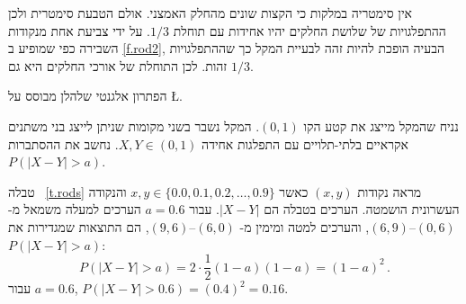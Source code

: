 אין סימטריה במלקות כי הקצות שונים מהחלק האמצני. אולם הטבעת סימטרית ולכן ההתפלגויות של שלושת החלקים יהיו אחידות עם תוחלת
$1/3$.
על ידי צביעת אחת מנקודות השבירה כפי שמופיע ב%
\ref{f.rod2},
הבעיה הופכת להיות זהה לבעיית המקל כך שההתפלגויות זהות. לכן התוחלת של אורכי החלקים היא גם
$1/3$.


הפתרון אלגנטי שלהלן מבוסס על
\L{\cite{stack-rods}}.

נניח שהמקל מייצג את קטע הקו 
$(0,1)$.
המקל נשבר בשני מקומות שניתן לייצג בני משתנים אקראיים בלתי-תלויים עם התפלגות אחידה
$X,Y\in (0,1)$.
נחשב את ההסתברות
$P(|X-Y|>a)$.

טבלה%
~\ref{t.rods}
מראה נקודות 
$(x,y)$
כאשר
$x,y \in \{0.0, 0.1, 0.2, \ldots, 0.9\}$
והנקודה העשרונית הושמטה. הערכים בטבלה הם
$|X-Y|$.
עבור
$a=0.6$
הערכים למעלה משמאל מ-%
$(0,6)$--$(6,9)$,
והערכים למטה ומימין מ-%
$(6,0)$--$(9,6)$,
הם התוצאות שמגדירות את
$P(|X-Y|>a)$:
\[
P(|X-Y|>a)=2\cdot \frac{1}{2}(1-a)(1-a)=(1-a)^2\,.
\]
עבור
$a=0.6$, $P(|X-Y|>0.6)=(0.4)^2=0.16$.

